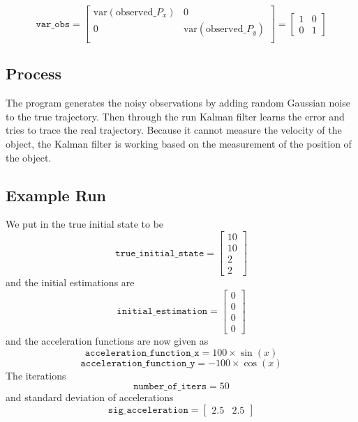 \documentclass[12pt]{article}
\begin{document}
	\begin{equation}
			\mathtt{var\_obs}=
			\begin{bmatrix}
				\mathrm{var}(\mathrm{observed}\_P_x) & 0 \\
				0 & \mathrm{var}(\mathrm{observed}\_P_y) \\
			\end{bmatrix}=
			\begin{bmatrix}
				1 & 0 \\
				0 & 1
			\end{bmatrix}
	\end{equation}

	\subsection{Process}\label{sub:Process}
	The program generates the noisy observations by adding random Gaussian noise to the true trajectory. Then through the run Kalman filter learns the error and tries to trace the real trajectory. Because it cannot measure the velocity of the object, the Kalman filter is working based on the measurement of the position of the object.

	\subsection{Example Run}\label{sub:Example Run}
	We put in the true initial state to be
	\[
		\mathtt{true\_initial\_state}=
		\begin{bmatrix}
			10 \\ 10 \\ 2 \\ 2
		\end{bmatrix}
	\]
	and the initial estimations are
	\[
		\mathtt{initial\_estimation}=
		\begin{bmatrix}
			0 \\ 0 \\ 0 \\ 0
		\end{bmatrix}
	\]
	and the acceleration functions are now given as
	\[
		\mathtt{acceleration\_function\_x}=100\times\sin(x)
	\]
	\[
		\mathtt{acceleration\_function\_y}=-100\times\cos(x)
	\]
	The iterations
	\[
		\mathtt{number\_of\_iters}=50
	\]
	and standard deviation of accelerations
	\[
		\mathtt{sig\_acceleration}=
		\begin{bmatrix}
			2.5 & 2.5
		\end{bmatrix}
	\]

\end{document}
